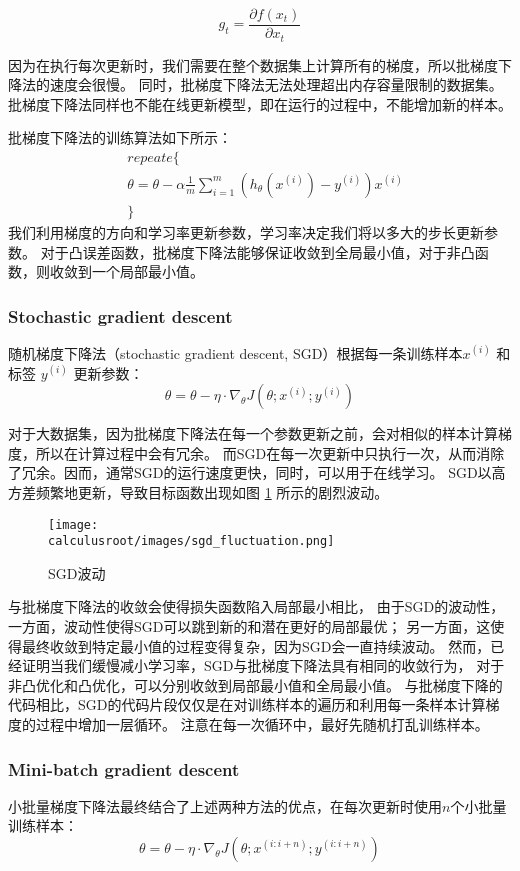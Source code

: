\[
    g_{t} = \frac{\partial f(x_t)}{\partial x_t}
\]

因为在执行每次更新时，我们需要在整个数据集上计算所有的梯度，所以批梯度下降法的速度会很慢。
同时，批梯度下降法无法处理超出内存容量限制的数据集。
批梯度下降法同样也不能在线更新模型，即在运行的过程中，不能增加新的样本。

批梯度下降法的训练算法如下所示：
\begin{align*}
    & repeate \{ \\
    &    \theta = \theta - \alpha \frac{1}{m}{\sum_{i=1}^{m}{(h_{\theta}(x^{(i)}) - y^{(i)})x^{(i)}}} \\
    & \}
\end{align*}
我们利用梯度的方向和学习率更新参数，学习率决定我们将以多大的步长更新参数。
对于凸误差函数，批梯度下降法能够保证收敛到全局最小值，对于非凸函数，则收敛到一个局部最小值。


\subsubsection{Stochastic gradient descent}
随机梯度下降法（stochastic gradient descent, SGD）根据每一条训练样本$ x^{(i)}$ 和标签 $y^{(i)}$ 更新参数：
\[
    \theta = \theta - \eta \cdot \nabla_{\theta}{J(\theta;x^{(i)};y^{(i)})}
\]

对于大数据集，因为批梯度下降法在每一个参数更新之前，会对相似的样本计算梯度，所以在计算过程中会有冗余。
而SGD在每一次更新中只执行一次，从而消除了冗余。因而，通常SGD的运行速度更快，同时，可以用于在线学习。
SGD以高方差频繁地更新，导致目标函数出现如图 \ref{fig:sgd_fluctuation} 所示的剧烈波动。

\begin{figure}[H]
    \centering
    \texttt{[image: \\calculusroot/images/sgd\_fluctuation.png]}
    \caption{SGD波动}
    \label{fig:sgd_fluctuation}
\end{figure}

与批梯度下降法的收敛会使得损失函数陷入局部最小相比，
由于SGD的波动性，一方面，波动性使得SGD可以跳到新的和潜在更好的局部最优；
另一方面，这使得最终收敛到特定最小值的过程变得复杂，因为SGD会一直持续波动。
然而，已经证明当我们缓慢减小学习率，SGD与批梯度下降法具有相同的收敛行为，
对于非凸优化和凸优化，可以分别收敛到局部最小值和全局最小值。
与批梯度下降的代码相比，SGD的代码片段仅仅是在对训练样本的遍历和利用每一条样本计算梯度的过程中增加一层循环。
注意在每一次循环中，最好先随机打乱训练样本。


\subsubsection{Mini-batch gradient descent}
小批量梯度下降法最终结合了上述两种方法的优点，在每次更新时使用$n$个小批量训练样本：
\[
    \theta = \theta - \eta \cdot \nabla_{\theta}{J(\theta;x^{(i:i+n)};y^{(i:i+n)})}
\]

